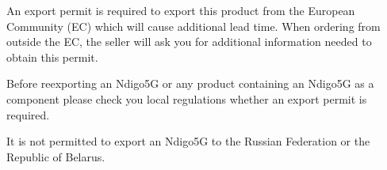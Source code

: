An export permit is required to export this product from the European Community (EC) which will cause additional lead time. When ordering from outside the EC, the seller will ask you for additional information needed to obtain this permit.

Before reexporting an Ndigo5G or any product containing an Ndigo5G as a component please check you local regulations whether an export permit is required.

It is not permitted to export an Ndigo5G to the Russian Federation or the Republic of Belarus.